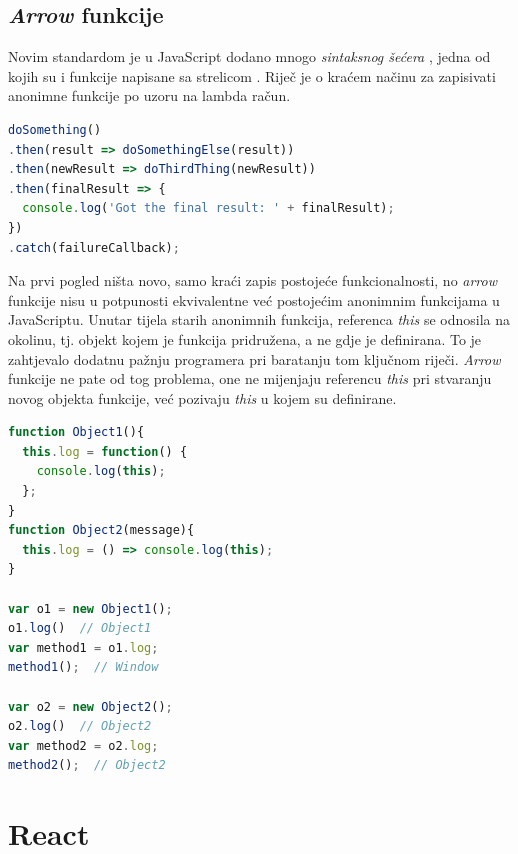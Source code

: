 \documentclass[times, utf8, zavrsni, numeric]{fer}
\newcommand{\razmakp}{\vspace{18pt}}
\newcommand{\razmaks}{\vspace{10pt}}
\begin{document}
\razmakp


\subsection{\emph{Arrow} funkcije}

Novim standardom je u JavaScript dodano mnogo \emph{sintaksnog šećera} , jedna od kojih su i funkcije napisane sa strelicom .
Riječ je o kraćem načinu za zapisivati anonimne funkcije po uzoru na lambda račun.

\razmakp
\begin{lstlisting}[language=JavaScript, caption={Kod iz isječka \ref{lst:callback_vs_promises} napisan pomoću \emph{arrow} funkcija}, label={lst:arrow_promises}]
doSomething()
.then(result => doSomethingElse(result))
.then(newResult => doThirdThing(newResult))
.then(finalResult => {
  console.log('Got the final result: ' + finalResult);
})
.catch(failureCallback);
\end{lstlisting}
\razmaks

Na prvi pogled ništa novo, samo kraći zapis postojeće funkcionalnosti, no \emph{arrow} funkcije nisu u potpunosti ekvivalentne već postojećim anonimnim funkcijama u JavaScriptu.
Unutar tijela starih anonimnih funkcija, referenca \emph{this} se odnosila na okolinu, tj. objekt kojem je funkcija pridružena, a ne gdje je definirana.
To je zahtjevalo dodatnu pažnju programera pri baratanju tom ključnom riječi.
\emph{Arrow} funkcije ne pate od tog problema, one ne mijenjaju referencu \emph{this} pri stvaranju novog objekta funkcije, već pozivaju \emph{this} u kojem su definirane.\citep{MDNArrowFunc}

\razmakp

\razmakp
\begin{lstlisting}[language=JavaScript, caption={Ponašanje ključne riječi \emph{this} u obe verzije anonimnih funkcija}]
function Object1(){
  this.log = function() {
    console.log(this);
  };
}
function Object2(message){
  this.log = () => console.log(this);
}

var o1 = new Object1();
o1.log()  // Object1
var method1 = o1.log;
method1();  // Window

var o2 = new Object2();
o2.log()  // Object2
var method2 = o2.log;
method2();  // Object2
\end{lstlisting}
\razmaks

\newpage


\section{React}
\end{document}

